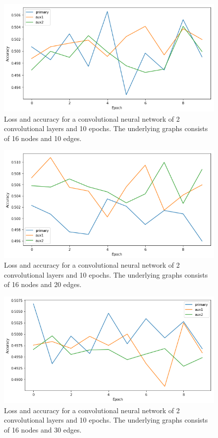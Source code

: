 \documentclass[letterpaper,UKenglish]{lipics-v2018}
\begin{document}
\begin{figure}
\centering
  \includegraphics[scale = .5]{pic/10-edges-conv.png}
\caption{Loss and accuracy for a convolutional neural network of 2 convolutional layers and 10 epochs. The underlying graphs consists of 16 nodes and 10 edges.}
\end{figure}

\begin{figure}
\centering
  \includegraphics[scale = .5]{pic/20-edges-conv.png}
\caption{Loss and accuracy for a convolutional neural network of 2 convolutional layers and 10 epochs. The underlying graphs consists of 16 nodes and 20 edges.}
\end{figure}

\begin{figure}
\centering
  \includegraphics[scale = .5]{pic/30-edges-conv.png}
\caption{Loss and accuracy for a convolutional neural network of 2 convolutional layers and 10 epochs. The underlying graphs consists of 16 nodes and 30 edges.}
\end{figure}
\end{document}
